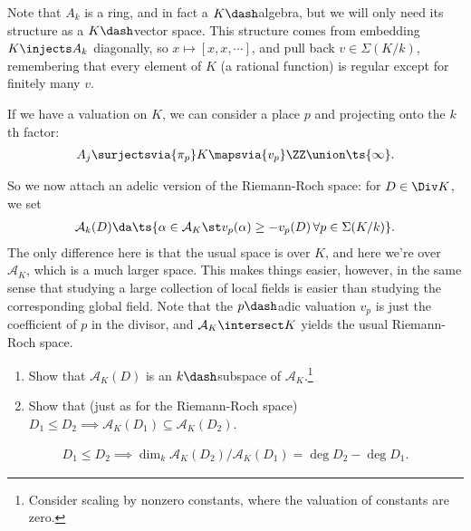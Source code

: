 Note that \(A_k\) is a ring, and in fact a \(K\dash\)algebra, but we
will only need its structure as a \(K\dash\)vector space. This structure
comes from embedding \(K\injects A_k\) diagonally, so
\(x \mapsto [x, x, \cdots]\), and pull back \(v\in \Sigma(K/k)\),
remembering that every element of \(K\) (a rational function) is regular
except for finitely many \(v\).

If we have a valuation on \(K\), we can consider a place \(p\) and
projecting onto the \(k\)th factor:
\begin{align*}  
A_j \surjectsvia{\pi_p} K \mapsvia{v_p} \ZZ \union \ts{\infty}
.\end{align*}

So we now attach an adelic version of the Riemann-Roch space: for
\(D\in \Div K\), we set
\begin{align*}  
\mathcal{A}_k(D) \da \ts{ \alpha \in \mathcal{A}_K \st v_p(\alpha) \geq -v_p(D) \, \forall p \in \Sigma(K/k)}
.\end{align*} The only difference here is that the usual space is over
\(K\), and here we're over \(\mathcal{A}_K\), which is a much larger
space. This makes things easier, however, in the same sense that
studying a large collection of local fields is easier than studying the
corresponding global field. Note that the \(p\dash\)adic valuation
\(v_p\) is just the coefficient of \(p\) in the divisor, and
\(\mathcal{A}_K \intersect K\) yields the usual Riemann-Roch space.

\begin{exercise}[?]

\envlist

\begin{enumerate}
\def\labelenumi{\alph{enumi}.}
\item
  Show that \(\mathcal{A}_K(D)\) is an \(k\dash\)subspace of
  \(\mathcal{A}_K\).\footnote{Consider scaling by nonzero constants,
    where the valuation of constants are zero.}
\item
  Show that (just as for the Riemann-Roch space)
  \(D_1 \leq D_2 \implies \mathcal{A}_K(D_1) \subseteq \mathcal{A}_K(D_2)\).
\end{enumerate}

\end{exercise}

\begin{lemma}[?]

\begin{align*}  
D_1 \leq D_2 \implies \dim_k \mathcal{A}_K(D_2) / \mathcal{A}_K(D_1) = \deg D_2 - \deg D_1
.\end{align*}

\end{lemma}

